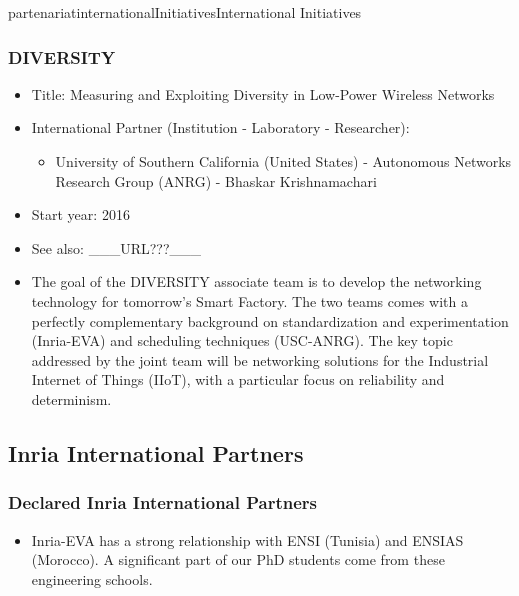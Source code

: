 \documentclass{ra2016}
\begin{document}
\begin{module}{partenariat}{internationalInitiatives}{International Initiatives}
\subsubsection{DIVERSITY}
\begin{itemize}
 \item Title: Measuring and Exploiting Diversity in Low-Power Wireless Networks
 \item International Partner (Institution -  Laboratory - Researcher):
 \begin{itemize}
    \item University of Southern California (United States)  
 - Autonomous Networks Research Group (ANRG) - Bhaskar Krishnamachari
 \end{itemize}
 \item Start year: 2016\item See also: \_\_\_URL???\_\_\_
 \item The goal of the DIVERSITY associate team is to develop the networking technology for tomorrow's Smart Factory. The two teams comes with a perfectly complementary background on standardization and experimentation (Inria-EVA) and scheduling techniques (USC-ANRG). The key topic addressed by the joint team will be networking solutions for the Industrial Internet of Things (IIoT), with a particular focus on reliability and determinism. 
\end{itemize}





\subsection{Inria International Partners}

	\subsubsection{Declared Inria International Partners}

\begin{itemize}
    
    \item Inria-EVA has a strong relationship with ENSI (Tunisia) and ENSIAS (Morocco).
        A significant part of our PhD students come from these engineering schools. 
    

\end{itemize}
\end{module}
\end{document}
